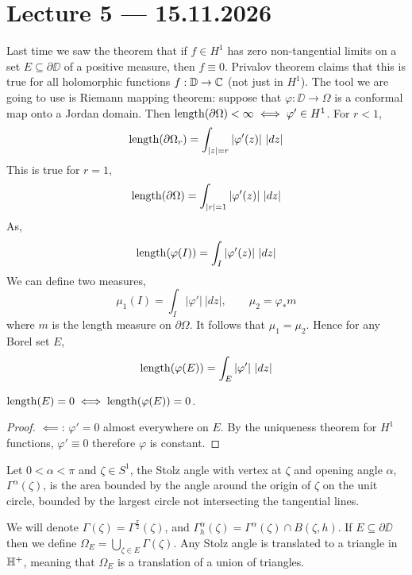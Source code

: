 \section{Lecture 5 --- 15.11.2026}
Last time we saw the theorem that if $f \in H^1$ has zero non-tangential limits on a set $E \subseteq \partial \DD$ of a positive measure, then $f \equiv 0$.
Privalov theorem claims that this is true for all holomorphic functions $f : \mathbb{D} \to \mathbb{C}$ (not just in $H^1$).
The tool we are going to use is Riemann mapping theorem: suppose that $\varphi : \DD \to \Omega$ is a conformal map onto a Jordan domain.
Then $\operatorname{length}(\partial \Omega) < \infty \iff \varphi' \in H^1$.
For $r < 1$,
\[
	\operatorname{length}(\partial \Omega_r)
	= \int_{|z| = r} |\varphi'(z)|\ |d z|
\]
This is true for $r = 1$,
\[
	\operatorname{length}(\partial \Omega)
	= \int_{|r| = 1} |\varphi'(z)|\ |d z|
\]
As,
\[
	\operatorname{length}(\varphi(I))
	= \int_I |\varphi'(z)|\ |d z|
\]
We can define two measures,
\[
	\mu_1(I)
	= \int_I |\varphi'|\ |d z|,
	\qquad
	\mu_2 = \varphi_* m
\]
where $m$ is the length measure on $\partial \Omega$.
It follows that $\mu_1 = \mu_2$.
Hence for any Borel set $E$,
\[
	\operatorname{length}(\varphi(E))
	= \int_E |\varphi'|\ |d z|
\]
\begin{corollary}
	$\operatorname{length}(E) = 0 \iff \operatorname{length}(\varphi(E)) = 0$.
\end{corollary}
\begin{proof}
	$\impliedby$:
	$\varphi' = 0$ almost everywhere on $E$.
	By the uniqueness theorem for $H^1$ functions, $\varphi' \equiv 0$ therefore $\varphi$ is constant.
\end{proof}
\begin{definition}
	Let $0 < \alpha < \pi$ and $\zeta \in S^1$, the Stolz angle with vertex at $\zeta$ and opening angle $\alpha$, $\Gamma^{\alpha}(\zeta)$,
	is the area bounded by the angle around the origin of $\zeta$ on the unit circle, bounded by the largest circle not intersecting the tangential lines.
\end{definition}
We will denote $\Gamma(\zeta) = \Gamma^{\frac{\pi}{2}}(\zeta)$, and $\Gamma_h^{\alpha}(\zeta) = \Gamma^{\alpha}(\zeta) \cap B(\zeta, h)$.
If $E \subseteq \partial \DD$ then we define $\Omega_E = \bigcup_{\zeta \in E} \Gamma(\zeta)$.
Any Stolz angle is translated to a triangle in $\mathbb{H}^+$, meaning that $\Omega_E$ is a translation of a union of triangles.
